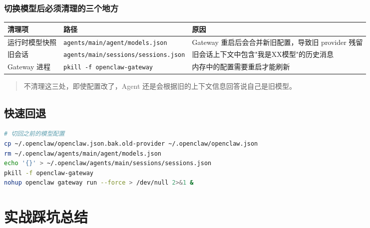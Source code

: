 \subsubsection{切换模型后必须清理的三个地方}


\begin{table}[h]
\centering
\small
\begin{tabular}{|l|l|l|}
\hline
清理项 & 路径 & 原因 \\
\hline
运行时模型快照 & \texttt{agents/main/agent/models.json} & Gateway 重启后会合并新旧配置，导致旧 provider 残留 \\
\hline
旧会话 & \texttt{agents/main/sessions/sessions.json} & 旧会话上下文中包含"我是XX模型"的历史消息 \\
\hline
Gateway 进程 & \texttt{pkill -f openclaw-gateway} & 内存中的配置需要重启才能刷新 \\
\hline
\end{tabular}
\end{table}

\begin{quote}
不清理这三处，即使配置改了，Agent 还是会根据旧的上下文信息回答说自己是旧模型。
\end{quote}

\subsection{快速回退}


\begin{lstlisting}[language=bash]
# 切回之前的模型配置
cp ~/.openclaw/openclaw.json.bak.old-provider ~/.openclaw/openclaw.json
rm ~/.openclaw/agents/main/agent/models.json
echo '{}' > ~/.openclaw/agents/main/sessions/sessions.json
pkill -f openclaw-gateway
nohup openclaw gateway run --force > /dev/null 2>&1 &
\end{lstlisting}

\hrulefill

\section{实战踩坑总结}



